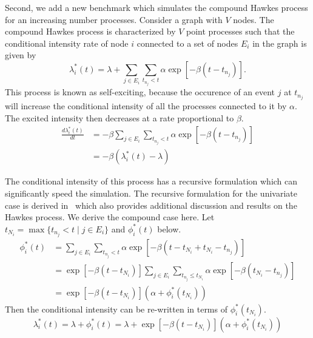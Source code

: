 \documentclass{juliacon}
\numberwithin{equation}{section}
\begin{document}
Second, we add a new benchmark which simulates the compound Hawkes process for an increasing number processes. Consider a graph with \( V \) nodes. The compound Hawkes process is characterized by \( V \) point processes such that the conditional intensity rate of node \( i \) connected to a set of nodes \( E_i \) in the graph is given by
\begin{equation}
  \lambda_i^\ast (t) = \lambda + \sum_{j \in E_i} \sum_{t_{n_j} < t} \alpha \exp \left[-\beta (t - t_{n_j}) \right].
\end{equation}
This process is known as self-exciting, because the occurence of an event \( j \) at \( t_{n_j} \) will increase the conditional intensity of all the processes connected to it by \( \alpha \). The excited intensity then decreases at a rate proportional to \( \beta \).
\begin{equation}
\begin{split}
  \frac{d \lambda_i^\ast (t)}{d t}
    &= -\beta \sum_{j \in E_i} \sum_{t_{n_j} < t} \alpha \exp \left[-\beta (t - t_{n_j}) \right] \\
    &= -\beta \left( \lambda_i^\ast (t) - \lambda \right)
\end{split}
\end{equation}

The conditional intensity of this process has a recursive formulation which can significantly speed the simulation. The recursive formulation for the univariate case is derived in~\cite{laub2021} which also provides additional discussion and results on the Hawkes process. We derive the compound case here. Let \( t_{N_i} = \max \{ t_{n_j} < t \mid j \in E_i \} \) and \( \phi_i^\ast (t) \) below.
\begin{equation}
\begin{split}
  \phi_i^\ast (t)
    &= \sum_{j \in E_i} \sum_{t_{n_j} < t} \alpha \exp \left[-\beta (t - t_{N_i} + t_{N_i} - t_{n_j}) \right] \\
    &= \exp \left[ -\beta (t - t_{N_i}) \right] \sum_{j \in E_i} \sum_{t_{n_j} \leq t_{N_i}} \alpha \exp \left[-\beta (t_{N_i} - t_{n_j}) \right] \\
    &= \exp \left[ -\beta (t - t_{N_i}) \right] \left( \alpha + \phi_i^\ast (t_{N_i}) \right)
\end{split}
\end{equation}
Then the conditional intensity can be re-written in terms of \( \phi_i^\ast (t_{N_i}) \).
\begin{equation}
  \lambda_i^\ast (t) = \lambda + \phi_i^\ast (t) = \lambda + \exp \left[ -\beta (t - t_{N_i}) \right] \left( \alpha + \phi_i^\ast (t_{N_i}) \right)
\end{equation}
\end{document}
